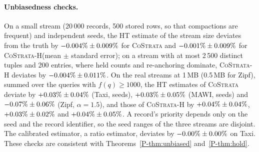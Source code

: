 \documentclass[sigconf,review,anonymous]{acmart}
\newcommand{\cs}{\textsc{CoStrata}\xspace}
\newcommand{\csh}{\textsc{CoStrata-H}\xspace}
\newcommand{\pref}[1]{\ref{P-#1}}
\begin{document}
\paragraph{Unbiasedness checks.} On a small stream (20\,000 records, 500 stored rows, so that compactions
are frequent) and \NumProbeSeeds{} independent seeds, the HT estimate of the stream size deviates from the
truth by $-0.004\%\pm0.009\%$ for \cs and $-0.001\%\pm0.009\%$ for \csh (mean
$\pm$ standard error); on a stream with at most 2\,500 distinct tuples and 200 entries, where held counts
and re-anchoring dominate, \csh deviates by $-0.004\%\pm0.011\%$. On the real streams
at 1\,MB (0.5\,MB for Zipf), summed over the queries with $f(q)\ge1000$, the HT estimates of \cs deviate
by $+0.03\%\pm0.04\%$ (Taxi, \NumBiasSeedsTaxi{} seeds),
$+0.03\%\pm0.05\%$ (MAWI, \NumBiasSeedsMawi{} seeds) and
$-0.07\%\pm0.06\%$ (Zipf, $\alpha=1.5$), and those of \csh by
$+0.04\%\pm0.04\%$,
$+0.03\%\pm0.02\%$ and
$+0.04\%\pm0.05\%$. A record's priority depends only on the seed and
the record identifier, so the seed ranges of the three streams are disjoint. The calibrated estimator, a
ratio estimator, deviates by $-0.00\%\pm0.00\%$ on Taxi.
These checks are consistent with Theorems~\pref{thm:unbiased} and~\pref{thm:hold}.



\end{document}
